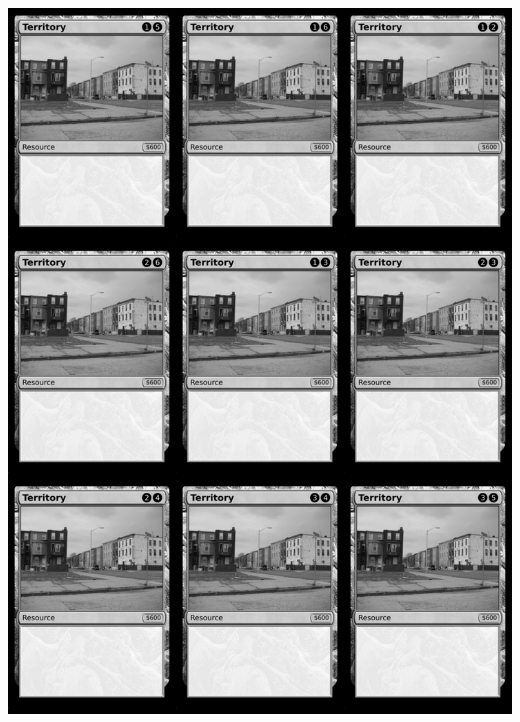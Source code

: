 \documentclass[a4paper]{article}
\begin{document}
\begin{center}
	\centering
	\includegraphics[width=190.5mm,height=266.7mm]{output/temp/page24.png}
\end{center}

\newpage
\end{document}
